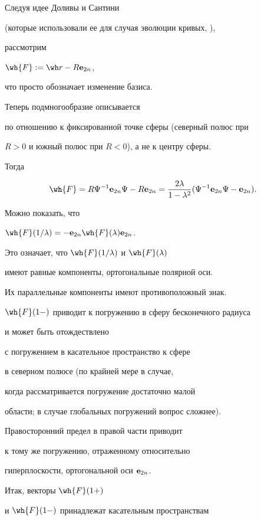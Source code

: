 Следуя идее Доливы и Сантини


(которые использовали ее для случая эволюции кривых, \cite{DS2}),


рассмотрим


$\wh{F} := {\wh r} - R \e_{2n}$,


что просто обозначает изменение базиса.


Теперь подмногообразие описывается


по отношению к фиксированной точке сферы (северный полюс при


$R>0$ и южный полюс при $R<0$), а не к центру сферы.


Тогда


\begin{equation}


\label{hatF1}


\wh{F} = R \Psi^{-1} \e_{2n} \Psi - R \e_{2n} = 


\frac{2\lambda}{1 - \lambda^2} 


( \Psi^{-1} \e_{2n} \Psi - \e_{2n}).


\end{equation}


Можно показать, что


$\wh{F} (1/\lambda) = - \e_{2n} \wh{F} (\lambda) \e_{2n}$.


Это означает, что $\wh{F} (1/\lambda)$ и $\wh{F} (\lambda)$


имеют равные компоненты, ортогональные полярной оси.


Их параллельные компоненты имеют противоположный знак.


$\wh{F}(1-)$ приводит к погружению в сферу бесконечного радиуса


и может быть отождествлено


с погружением в касательное пространство к сфере


в северном полюсе (по крайней мере в случае,


когда рассматривается погружение достаточно малой


области; в случае глобальных погружений вопрос сложнее).


Правосторонний предел в правой части приводит


к тому же погружению, отраженному относительно


гиперплоскости, ортогональной оси $\bold e_{2n}$.


Итак, векторы $\wh{F} (1+)$


и $\wh{F} (1-)$ принадлежат касательным пространствам


